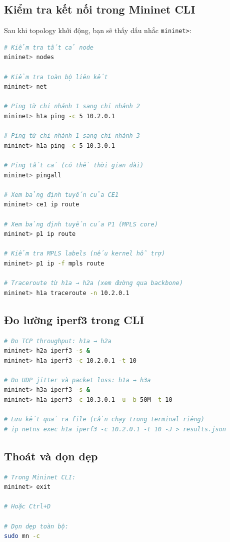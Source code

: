 \subsection{Kiểm tra kết nối trong Mininet CLI}

Sau khi topology khởi động, bạn sẽ thấy dấu nhắc \texttt{mininet>}:

\begin{lstlisting}[language=bash, frame=single, basicstyle=\ttfamily\small]
# Kiểm tra tất cả node
mininet> nodes

# Kiểm tra toàn bộ liên kết
mininet> net

# Ping từ chi nhánh 1 sang chi nhánh 2
mininet> h1a ping -c 5 10.2.0.1

# Ping từ chi nhánh 1 sang chi nhánh 3
mininet> h1a ping -c 5 10.3.0.1

# Ping tất cả (có thể thời gian dài)
mininet> pingall

# Xem bảng định tuyến của CE1
mininet> ce1 ip route

# Xem bảng định tuyến của P1 (MPLS core)
mininet> p1 ip route

# Kiểm tra MPLS labels (nếu kernel hỗ trợ)
mininet> p1 ip -f mpls route

# Traceroute từ h1a → h2a (xem đường qua backbone)
mininet> h1a traceroute -n 10.2.0.1
\end{lstlisting}

\subsection{Đo lường iperf3 trong CLI}

\begin{lstlisting}[language=bash, frame=single, basicstyle=\ttfamily\small]
# Đo TCP throughput: h1a → h2a
mininet> h2a iperf3 -s &
mininet> h1a iperf3 -c 10.2.0.1 -t 10

# Đo UDP jitter và packet loss: h1a → h3a
mininet> h3a iperf3 -s &
mininet> h1a iperf3 -c 10.3.0.1 -u -b 50M -t 10

# Lưu kết quả ra file (cần chạy trong terminal riêng)
# ip netns exec h1a iperf3 -c 10.2.0.1 -t 10 -J > results.json
\end{lstlisting}

\subsection{Thoát và dọn dẹp}

\begin{lstlisting}[language=bash, frame=single, basicstyle=\ttfamily\small]
# Trong Mininet CLI:
mininet> exit

# Hoặc Ctrl+D

# Dọn dẹp toàn bộ:
sudo mn -c
\end{lstlisting}


